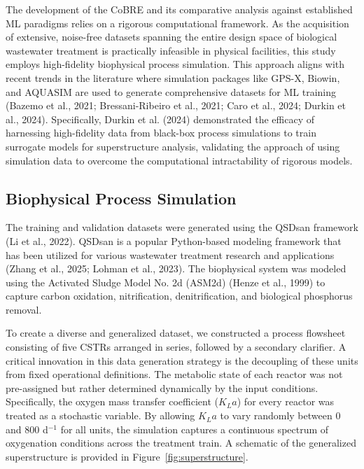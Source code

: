 \documentclass{article}
\begin{document}
The development of the CoBRE and its comparative analysis against established ML paradigms relies on a rigorous computational framework. As the acquisition of extensive, noise-free datasets spanning the entire design space of biological wastewater treatment is practically infeasible in physical facilities, this study employs high-fidelity biophysical process simulation. This approach aligns with recent trends in the literature where simulation packages like GPS-X, Biowin, and AQUASIM are used to generate comprehensive datasets for ML training (Bazemo et al., 2021; Bressani-Ribeiro et al., 2021; Caro et al., 2024; Durkin et al., 2024). Specifically, Durkin et al. (2024) demonstrated the efficacy of harnessing high-fidelity data from black-box process simulations to train surrogate models for superstructure analysis, validating the approach of using simulation data to overcome the computational intractability of rigorous models.

\subsection{Biophysical Process Simulation}
The training and validation datasets were generated using the QSDsan framework (Li et al., 2022). QSDsan is a popular Python-based modeling framework that has been utilized for various wastewater treatment research and applications (Zhang et al., 2025; Lohman et al., 2023). The biophysical system was modeled using the Activated Sludge Model No. 2d (ASM2d) (Henze et al., 1999) to capture carbon oxidation, nitrification, denitrification, and biological phosphorus removal.

To create a diverse and generalized dataset, we constructed a process flowsheet consisting of five CSTRs arranged in series, followed by a secondary clarifier. A critical innovation in this data generation strategy is the decoupling of these units from fixed operational definitions. The metabolic state of each reactor was not pre-assigned but rather determined dynamically by the input conditions. Specifically, the oxygen mass transfer coefficient ($K_{L}a$) for every reactor was treated as a stochastic variable. By allowing $K_{L}a$ to vary randomly between 0 and 800 d$^{-1}$ for all units, the simulation captures a continuous spectrum of oxygenation conditions across the treatment train. A schematic of the generalized superstructure is provided in Figure~\ref{fig:superstructure}.
\end{document}
